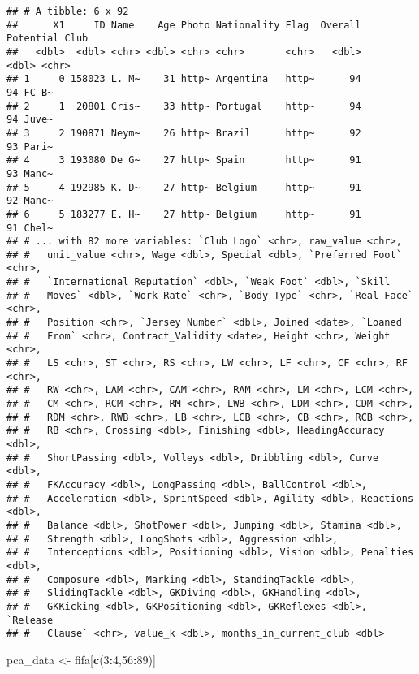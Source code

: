 \documentclass[]{article}
\newenvironment{Shaded}{\begin{snugshade}}{\end{snugshade}}
\newcommand{\DecValTok}[1]{\textcolor[rgb]{0.00,0.00,0.81}{#1}}
\newcommand{\KeywordTok}[1]{\textcolor[rgb]{0.13,0.29,0.53}{\textbf{#1}}}
\newcommand{\NormalTok}[1]{#1}
\newcommand{\OperatorTok}[1]{\textcolor[rgb]{0.81,0.36,0.00}{\textbf{#1}}}
\newcommand{\StringTok}[1]{\textcolor[rgb]{0.31,0.60,0.02}{#1}}
\begin{document}
\begin{verbatim}
## # A tibble: 6 x 92
##      X1     ID Name    Age Photo Nationality Flag  Overall Potential Club 
##   <dbl>  <dbl> <chr> <dbl> <chr> <chr>       <chr>   <dbl>     <dbl> <chr>
## 1     0 158023 L. M~    31 http~ Argentina   http~      94        94 FC B~
## 2     1  20801 Cris~    33 http~ Portugal    http~      94        94 Juve~
## 3     2 190871 Neym~    26 http~ Brazil      http~      92        93 Pari~
## 4     3 193080 De G~    27 http~ Spain       http~      91        93 Manc~
## 5     4 192985 K. D~    27 http~ Belgium     http~      91        92 Manc~
## 6     5 183277 E. H~    27 http~ Belgium     http~      91        91 Chel~
## # ... with 82 more variables: `Club Logo` <chr>, raw_value <chr>,
## #   unit_value <chr>, Wage <dbl>, Special <dbl>, `Preferred Foot` <chr>,
## #   `International Reputation` <dbl>, `Weak Foot` <dbl>, `Skill
## #   Moves` <dbl>, `Work Rate` <chr>, `Body Type` <chr>, `Real Face` <chr>,
## #   Position <chr>, `Jersey Number` <dbl>, Joined <date>, `Loaned
## #   From` <chr>, Contract_Validity <date>, Height <chr>, Weight <chr>,
## #   LS <chr>, ST <chr>, RS <chr>, LW <chr>, LF <chr>, CF <chr>, RF <chr>,
## #   RW <chr>, LAM <chr>, CAM <chr>, RAM <chr>, LM <chr>, LCM <chr>,
## #   CM <chr>, RCM <chr>, RM <chr>, LWB <chr>, LDM <chr>, CDM <chr>,
## #   RDM <chr>, RWB <chr>, LB <chr>, LCB <chr>, CB <chr>, RCB <chr>,
## #   RB <chr>, Crossing <dbl>, Finishing <dbl>, HeadingAccuracy <dbl>,
## #   ShortPassing <dbl>, Volleys <dbl>, Dribbling <dbl>, Curve <dbl>,
## #   FKAccuracy <dbl>, LongPassing <dbl>, BallControl <dbl>,
## #   Acceleration <dbl>, SprintSpeed <dbl>, Agility <dbl>, Reactions <dbl>,
## #   Balance <dbl>, ShotPower <dbl>, Jumping <dbl>, Stamina <dbl>,
## #   Strength <dbl>, LongShots <dbl>, Aggression <dbl>,
## #   Interceptions <dbl>, Positioning <dbl>, Vision <dbl>, Penalties <dbl>,
## #   Composure <dbl>, Marking <dbl>, StandingTackle <dbl>,
## #   SlidingTackle <dbl>, GKDiving <dbl>, GKHandling <dbl>,
## #   GKKicking <dbl>, GKPositioning <dbl>, GKReflexes <dbl>, `Release
## #   Clause` <chr>, value_k <dbl>, months_in_current_club <dbl>
\end{verbatim}

\begin{Shaded}
\begin{Highlighting}[]
\NormalTok{pca_data <-}\StringTok{ }\NormalTok{fifa[}\KeywordTok{c}\NormalTok{(}\DecValTok{3}\OperatorTok{:}\DecValTok{4}\NormalTok{,}\DecValTok{56}\OperatorTok{:}\DecValTok{89}\NormalTok{)]}
\end{Highlighting}
\end{Shaded}
\end{document}
